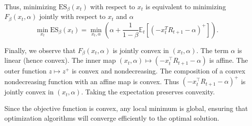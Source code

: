 Thus, minimizing $\text{ES}_\beta(x_t)$ with respect to $x_t$ is equivalent to minimizing $F_\beta(x_t, \alpha)$ jointly with respect to $x_t$ and $\alpha$
\begin{equation*} \label{eq:joint_opt}
    \min_{x_t} \text{ES}_\beta(x_t) = \min_{x_t, \alpha} \left( \alpha + \frac{1}{1-\beta} \mathbb{E}_t[(-x_t^T R_{t+1} - \alpha)^+] \right).
\end{equation*}

Finally, we observe that $F_\beta(x_t, \alpha)$ is jointly convex in $(x_t, \alpha)$. The term $\alpha$ is linear (hence convex). The inner map $(x_t, \alpha) \mapsto (-x_t^\top R_{t+1} - \alpha)$ is affine. The outer function $z \mapsto z^+$ is convex and nondecreasing. The composition of a convex nondecreasing function with an affine map is convex. Thus $(-x_t^\top R_{t+1} - \alpha)^+$ is jointly convex in $(x_t, \alpha)$. Taking the expectation preserves convexity.


Since the objective function is convex, any local minimum is global, ensuring that optimization algorithms will converge efficiently to the optimal solution.
